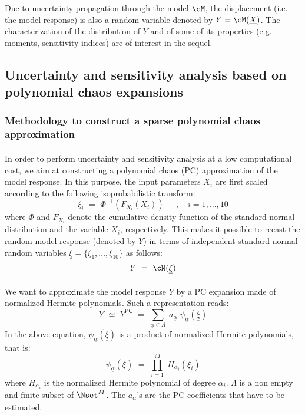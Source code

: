 \documentclass[11pt]{article}
\begin{document}
Due to uncertainty propagation through the model $\cM$, the displacement (i.e. the model response) is also a random variable denoted by $Y = \cM(\underline{X})$. The characterization of the distribution of $Y$ and of some of its properties (e.g. moments, sensitivity indices) are of interest in the sequel.

\subsection{Uncertainty and sensitivity analysis based on polynomial chaos expansions}

\subsubsection{Methodology to construct a sparse polynomial chaos approximation}

\paragraph{}
In order to perform uncertainty and sensitivity analysis at a low computational cost, we aim at constructing a polynomial chaos (PC) approximation of the model response. In this purpose, the input parameters $X_i$ are first scaled according to the following isoprobabilistic transform:
\begin{equation}
  \xi_i \, \, = \, \, \Phi^{-1}(F_{X_i}(X_i)) \, \quad \; , \quad i=1,\dots,10
\end{equation}
where $\Phi$ and $F_{X_i}$ denote the cumulative density function of the standard normal distribution and the variable $X_i$, respectively. This makes it possible to recast the random model response (denoted by $Y$) in terms of independent standard normal random variables $\underline{\xi} = \{\xi_1,\dots,\xi_{10}\}$ as follows:
\begin{equation}
  Y \, \, = \, \, \cM(\underline{\xi})
\end{equation}

\paragraph{}
We want to approximate the model response $Y$ by a PC expansion made of normalized Hermite polynomials. Such a representation reads:
\begin{equation}
  Y \, \, \simeq \, \, Y^\textsf{PC} \, \, = \, \, \sum_{\underline{\alpha} \in \Lambda} \; a_{\underline{\alpha}} \; \psi_{\underline{\alpha}}(\underline{\xi})
\end{equation}
In the above equation, $\psi_{\underline{\alpha}}(\underline{\xi})$ is a product of normalized Hermite polynomials, that is:
\begin{equation}
  \psi_{\underline{\alpha}}(\underline{\xi}) \, \, = \, \, \prod_{i=1}^M \; H_{\alpha_i}(\xi_i)
\end{equation}
where $H_{\alpha_i}$ is the normalized Hermite polynomial of degree $\alpha_i$. $\Lambda$ is a non empty and finite subset of $\Nset^M$. The $a_{\underline{\alpha}}$'s are the PC coefficients that have to be estimated.
\end{document}
